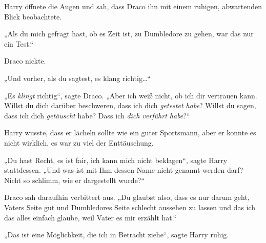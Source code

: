 Harry öffnete die Augen und sah, dass Draco ihn mit einem ruhigen, abwartenden Blick beobachtete.

„Als du mich gefragt hast, ob es Zeit ist, zu Dumbledore zu gehen, war das nur ein Test.“

Draco nickte.

„Und vorher, als du sagtest, es klang richtig…“

„Es \emph{klingt} richtig“, sagte Draco. „Aber ich weiß nicht, ob ich dir vertrauen kann. Willst du dich darüber beschweren, dass ich dich \emph{getestet habe}? Willst du sagen, dass ich dich \emph{getäuscht} habe? Dass ich \emph{dich verführt habe}?“

Harry wusste, dass er lächeln sollte wie ein guter Sportsmann, aber er konnte es nicht wirklich, es war zu viel der Enttäuschung.

„Du hast Recht, es ist fair, ich kann mich nicht beklagen“, sagte Harry stattdessen. „Und was ist mit Ihm-dessen-Name-nicht-genannt-werden-darf? Nicht so schlimm, wie er dargestellt wurde?“

Draco sah daraufhin verbittert aus. „Du glaubst also, dass es nur darum geht, Vaters Seite gut und Dumbledores Seite schlecht aussehen zu lassen und das ich das alles einfach glaube, weil Vater es mir erzählt hat.“

„Das ist eine Möglichkeit, die ich in Betracht ziehe“, sagte Harry ruhig.

